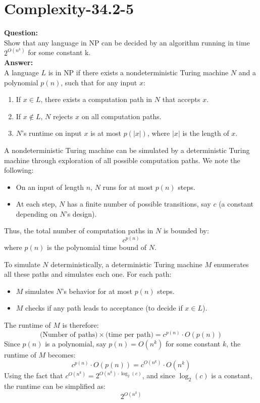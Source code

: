 \documentclass[12pt]{article}
\begin{document}
\section{Complexity-34.2-5}
\textbf{Question:}\\
Show that any language in NP can be decided by an algorithm running in time $2^{O(n^k)}$ for some constant k.\\
\textbf{Answer:}\\
A language \(L\) is in \(\text{NP}\) if there exists a nondeterministic Turing machine \(N\) and a polynomial \(p(n)\), such that for any input \(x\):
\begin{enumerate}
    \item If \(x \in L\), there exists a computation path in \(N\) that accepts \(x\).
    \item If \(x \notin L\), \(N\) rejects \(x\) on all computation paths.
    \item \(N\)'s runtime on input \(x\) is at most \(p(|x|)\), where \(|x|\) is the length of \(x\).
\end{enumerate}
A nondeterministic Turing machine can be simulated by a deterministic Turing machine through exploration of all possible computation paths. We note the following:
\begin{itemize}
    \item On an input of length \(n\), \(N\) runs for at most \(p(n)\) steps.
    \item At each step, \(N\) has a finite number of possible transitions, say \(c\) (a constant depending on \(N\)'s design).
\end{itemize}
Thus, the total number of computation paths in \(N\) is bounded by:
\[
c^{p(n)}
\]
where \(p(n)\) is the polynomial time bound of \(N\).

To simulate \(N\) deterministically, a deterministic Turing machine \(M\) enumerates all these paths and simulates each one. For each path:
\begin{itemize}
    \item \(M\) simulates \(N\)'s behavior for at most \(p(n)\) steps.
    \item \(M\) checks if any path leads to acceptance (to decide if \(x \in L\)).
\end{itemize}
The runtime of \(M\) is therefore:
\[
\text{(Number of paths)} \times \text{(time per path)} = c^{p(n)} \cdot O(p(n))
\]
Since \(p(n)\) is a polynomial, say \(p(n) = O(n^k)\) for some constant \(k\), the runtime of \(M\) becomes:
\[
c^{p(n)} \cdot O(p(n)) = c^{O(n^k)} \cdot O(n^k)
\]
Using the fact that \(c^{O(n^k)} = 2^{O(n^k) \cdot \log_2(c)}\), and since \(\log_2(c)\) is a constant, the runtime can be simplified as:
\[
2^{O(n^k)}
\]
\end{document}
